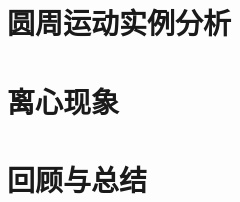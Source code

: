 \documentclass[color=purple,openany]{textbook-cn}
\begin{document}
\begin{Link}
\zhlipsum[1]
\end{Link}



\section{圆周运动实例分析}
\begin{Point}
\lipsum[2]
\end{Point}

\begin{Case}
\item \lipsum[1][3]
\item \lipsum[1][3]
\item \lipsum[1][3]
\item \lipsum[1][3]
\end{Case}

\begin{Link}
\zhlipsum[1]
\end{Link}




\section{离心现象}

\begin{Point}
\lipsum[2]
\end{Point}

\begin{Case}
\item \lipsum[1][3]
\item \lipsum[1][3]
\item \lipsum[1][3]
\item \lipsum[1][3]
\end{Case}

\begin{Link}
\zhlipsum[1]
\end{Link}





\section{回顾与总结}
\begin{Point}
\lipsum[2]
\end{Point}

\begin{Case*}
\item \lipsum[1][3]
\item \lipsum[1][3]
\item \lipsum[1][3]
\item \lipsum[1][3]
\end{Case*}
\end{document}
